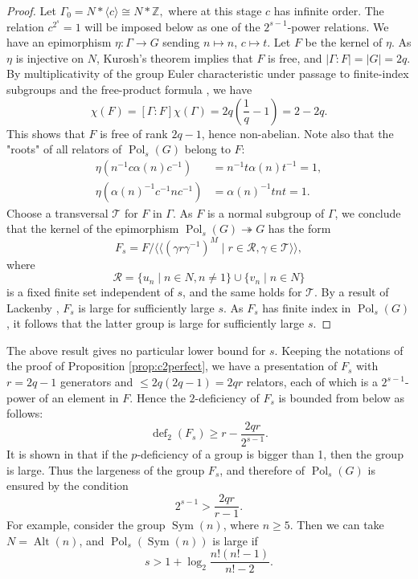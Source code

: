 \documentclass[a4paper,12pt]{amsart}
\theoremstyle{plain}
\theoremstyle{definition}
\theoremstyle{remark}
\numberwithin{equation}{subsection}
\DeclareMathOperator{\Sym}{Sym}
\DeclareMathOperator{\Pold}{Pol}
\DeclareMathOperator{\deff}{def}
\DeclareMathOperator{\Alt}{Alt}
\newcommand{\llangle}{\langle\!\langle}
\newcommand{\rrangle}{\rangle\!\rangle}
\begin{document}
\begin{proof}
   Let $\Gamma_0=N*\langle c\rangle \cong N*\mathbb Z,$
    where at this stage $c$ has infinite order.  The relation
    $c^{2^s}=1$ will be imposed below as one of the
    $2^{s-1}$-power relations. We have an epimorphism $\eta:\Gamma\to G$ sending $n\mapsto n$, $c\mapsto t$. Let $F$ be the kernel of $\eta$. As $\eta$ is injective on $N$, Kurosh's theorem implies that $F$ is free, and
    $|\Gamma:F|=|G|=2q$. By multiplicativity of the group Euler characteristic under passage to
    finite-index subgroups and the free-product formula
    \cite[Chapter IX, Proposition 7.3]{Bro82}, we have
    $$\chi(F)=[\Gamma:F]\chi(\Gamma)=2q\left(\frac1{q}-1\right)=2-2q.$$
    This shows that $F$ is free of rank $2q-1$, hence non-abelian. Note also that the "roots" of all relators of $\Pold_s(G)$ belong to $F$:
    \begin{align*}
        \eta(n^{-1}c\alpha(n)c^{-1}) &=n^{-1}t\alpha(n)t^{-1}=1,\\
        \eta(\alpha(n)^{-1}c^{-1}nc^{-1}) &=\alpha(n)^{-1}tnt=1.
    \end{align*}
    Choose a transversal $\mathcal{T}$ for $F$ in $\Gamma$. As $F$ is a normal subgroup of $\Gamma$, we conclude that the kernel of the epimorphism $\Pold_s(G)\twoheadrightarrow G$ has the form
    $$F_s=F/\llangle (\gamma r\gamma^{-1})^M\mid r\in\mathcal{R},\gamma\in\mathcal{T}\rrangle,$$
    where 
    $$\mathcal{R}=\{ u_n\mid n\in N, n\neq 1\} \cup\{v_n\mid n\in N\}$$
    is a fixed finite set independent of $s$, and the same holds for $\mathcal{T}$. By a result of Lackenby \cite[Theorem 1.2]{Lac07}, $F_s$ is large for sufficiently large $s$. As $F_s$ has finite index in $\Pold_s(G)$, it follows that the latter group is large for sufficiently large $s$. 
    \end{proof}

    The above result gives no particular lower bound for $s$. Keeping the notations of the proof of Proposition \ref{prop:c2perfect}, we have a presentation of $F_s$ with $r=2q-1$ generators and $\le 2q(2q-1)=2qr$ relators, each of which is a  $2^{s-1}$-power of an element in $F$. Hence the $2$-deficiency of $F_s$ is bounded from below as follows:
    $$\deff_2(F_s)\ge r-\frac{2qr}{2^{s-1}}.$$
    It is shown in \cite{BT11} that if the $p$-deficiency of a group is bigger than 1, then the group is large. Thus the largeness of the group $F_s$, and therefore of $\Pold_s(G)$ is ensured by the condition
    $$2^{s-1}>\frac{2qr}{r-1}.$$
    For example, consider the group $\Sym(n)$, where $n\ge 5$. Then we can 
    take $N=\Alt(n)$, and $\Pold_s(\Sym(n))$ is large if
    $$s>1+\log_2\frac{n!(n!-1)}{n!-2}.$$
\end{document}
